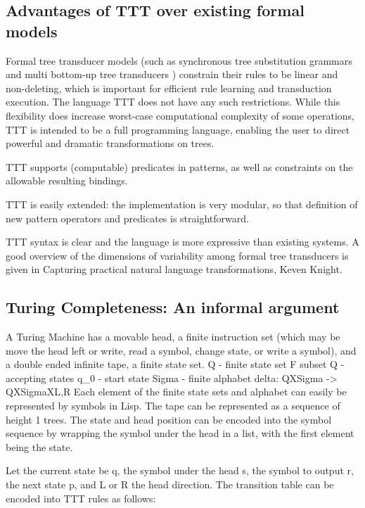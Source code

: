 \documentclass[11pt]{article}
\begin{document}
\subsection*{Advantages of TTT  over existing formal models}
Formal tree transducer models (such as synchronous tree substitution grammars and multi bottom-up tree transducers  \cite{Shieber-stag,Maletti-stsg}) constrain their rules to be linear and non-deleting, which is important for efficient rule learning and transduction execution.  The language TTT does not have any such restrictions.  While this flexibility does increase worst-case computational complexity of some operations, TTT is intended to be a full programming language, enabling the user to direct powerful and dramatic transformations on trees.

TTT supports (computable) predicates in patterns, as well as constraints on the allowable resulting bindings.

TTT is easily extended:  the implementation is very modular, so that definition of new pattern operators and predicates is straightforward. 

TTT syntax is clear and the language is more expressive than existing systems.
A good overview of the dimensions of variability among formal tree transducers is given in Capturing practical natural language transformations, Keven Knight.




\subsection*{Turing Completeness: An informal argument}
A Turing Machine has a movable head, a finite instruction set (which may be move the head left or write, read a symbol, change state, or write a symbol), 
and a double ended infinite tape, a finite state set. 
Q - finite state set 
F subset Q - accepting states 
q\_0 - start state
Sigma - finite alphabet
delta: QXSigma -> QXSigmaX{L,R}
Each element of the finite state sets and alphabet can easily be represented by symbols in Lisp. 
The tape can be represented as a sequence of height 1 trees.  The state and head position can be encoded into the symbol sequence by wrapping the symbol under the head in a list, with the first element being the state. 

Let the current state be q, the symbol under the head s, the symbol to output r, the next state p, and L or R the head direction.
The transition table can be encoded into TTT rules as follows: 
\end{document}
